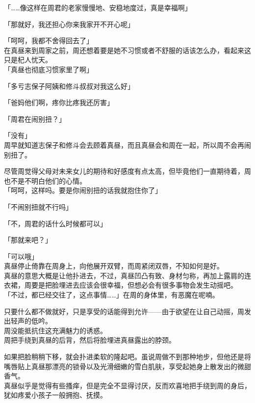 「……像这样在周君的老家慢慢地、安稳地度过，真是幸福啊」

「那就好，我还担心你来我家开不开心呢」

「呵呵，我都不舍得回去了」\\

在真昼来到周家之前，周还想着要是她不习惯或者不舒服的话该怎么办，看起来这只是杞人忧天。\\

「真昼也彻底习惯家里了啊」

「多亏志保子阿姨和修斗叔叔对我这么好」

「爸妈他们啊，疼你比疼我还厉害」

「周君在闹别扭？」

「没有」\\

周早就知道志保子和修斗会去顾着真昼，而且真昼会和周在一起，所以周不会再闹别扭了。

尽管周觉得父母对未来女儿的期待和好感度有点太高，但毕竟他们一直期待着，周也不是不明白他们的心情。\\

「呵呵，这样吗。要是你闹别扭的话我就抱住你了」

「不闹别扭就不行吗」

「不，周君的话什么时候都可以」

「那就来吧？」

「可以哦」\\

真昼停止倚靠在周身上，向他展开双臂，而周紧闭双唇，不知如何是好。\\

真昼的意思大概是让他扑进去，不过，真昼凹凸有致、身材匀称，再加上露肩的连衣裙，周要是把脸埋进去应该会很幸福，但想必会有很多事物会发生动摇吧。\\

「不过，都已经交往了，这点事情……」在周的身体里，有恶魔在呢喃。

只要什么都不做就好，只是享受的话能得到允许——由于欲望在让自己动摇，周发出轻声的低吟。\\

周没能抵抗住这充满魅力的诱惑。\\

周把手绕到真昼的后背，然后将脸埋进真昼露出的脖颈。

如果把脸稍稍下移，就会扑进柔软的隆起吧。虽说周做不到那种地步，但他还是将嘴唇贴上真昼那漂亮的锁骨以及光滑细嫩的雪白肌肤，享受起她身上散发出的微甜香气。\\

真昼似乎是觉得有些搔痒，但是完全不显得讨厌，反而欢喜地把手绕到周的身后，犹如疼爱小孩子一般拥抱、抚摸。\\


